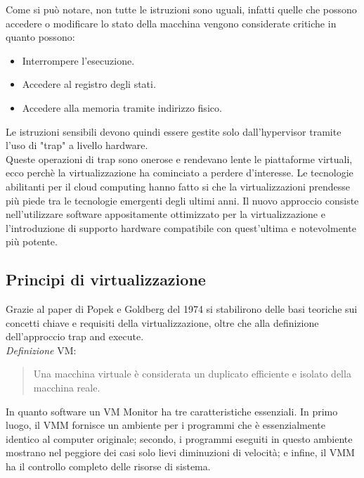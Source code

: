\documentclass{article}
\begin{document}
		Come si può notare, non tutte le istruzioni sono uguali, infatti quelle che possono accedere o modificare lo stato della macchina vengono considerate critiche in quanto possono:
		\begin{itemize}
		    \item Interrompere l'esecuzione.
		    \item Accedere al registro degli stati.
		    \item Accedere alla memoria tramite indirizzo fisico.
		\end{itemize}
		Le istruzioni sensibili devono quindi essere gestite solo dall'hypervisor tramite l'uso di "trap" a livello hardware.\\
		
		Queste operazioni di trap sono onerose e rendevano lente le piattaforme virtuali, ecco perchè la virtualizzazione ha cominciato a perdere d'interesse. Le tecnologie abilitanti per il cloud computing hanno fatto si che la virtualizzazioni prendesse più piede tra le tecnologie emergenti degli ultimi anni. Il nuovo approccio consiste nell'utilizzare software appositamente ottimizzato per la virtualizzazione e l'introduzione di supporto hardware compatibile con quest'ultima e notevolmente più potente. 
		
		\subsection{Principi di virtualizzazione}
		Grazie al paper di Popek e Goldberg del 1974 si stabilirono delle basi teoriche sui concetti chiave e requisiti della virtualizzazione, oltre che alla definizione dell'approccio trap and execute.\\
		\emph{Definizione} VM: 
		\begin{quotation}
			Una macchina virtuale è considerata un duplicato efficiente e isolato della macchina reale.
		\end{quotation}
		In quanto software un VM Monitor ha tre caratteristiche essenziali. In primo luogo, il VMM fornisce un ambiente per i programmi che è essenzialmente identico al computer originale; secondo, i programmi eseguiti in questo ambiente mostrano nel peggiore dei casi solo lievi diminuzioni di velocità; e infine, il VMM ha il controllo completo delle risorse di sistema.\\
		
\end{document}
